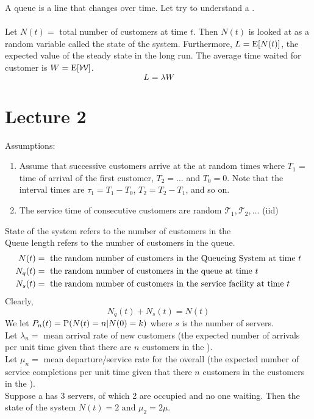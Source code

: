 \documentclass[12pt]{article}
\begin{document}
A queue is a line that changes over time. Let try to understand a \qs. \\~\\
Let $N(t) = $ total number of customers at time $t$. Then $N(t)$ is looked at as a random variable called the state of the system. Furthermore, $L = \mathrm{E}[ N(t) ]$, the expected value of the steady state in the long run. The average time waited for customer is $W = \mathrm{E}[ \mathcal{W} ]$. $$ L = \lambda W $$ 

\section{Lecture 2} 

Assumptions: \begin{enumerate} 
\item Assume that successive customers arrive at the \qs at random times where $T_1$ = time of arrival of the first customer, $T_2 = \dots $ and $T_0 = 0$. Note that the interval times are $\tau_1 = T_1 - T_0$, $T_2 = T_2 - T_1$, and so on. 
\item The service time of consecutive customers are random $\mathscr{T}_1, \mathscr{T}_2, \dots $ (iid) \end{enumerate} 
State of the system refers to the number of customers in the \qs \\
Queue length refers to the number of customers in the queue. 
$$ \begin{aligned} N(t) &= \text{ the random number of customers in the Queueing System at time } t \\ N_q(t) &= \text{ the random number of customers in the queue at time } t \\ 
N_s(t) &= \text{ the random number of customers in the service facility at time } t \end{aligned} $$ Clearly, $$N_q(t) + N_s(t) = N(t) $$
We let $P_n(t) = \mathrm{P}( N(t) = n | N(0) = k )$ where $s$ is the number of servers. \\
Let $\lambda_n = $ mean arrival rate of new customers (the expected number of arrivals per unit time given that there are $n$ customers in the \qs). \\
Let $\mu_n = $ mean departure/service rate for the overall \qs (the expected number of service completions per unit time given that there $n$ customers in the customers in the \qs). \\
Suppose a \qs has 3 servers, of which 2 are occupied and no one waiting. Then the state of the system $N(t) = 2$ and $\mu_2 = 2\mu$. \\
\end{document}
